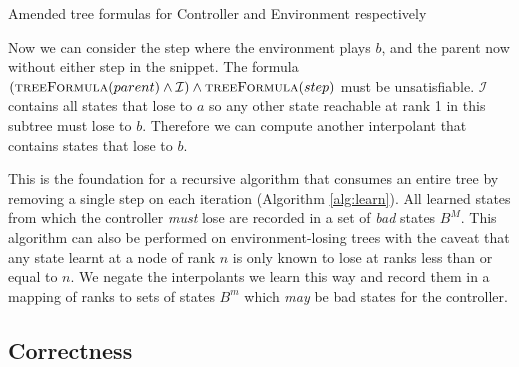 \documentclass{llncs}
\newcommand{\textoverline}[1]{$\overline{\mbox{#1}}$}
\begin{document}
\begin{algorithm}
    \caption{Amended tree formulas for Controller and Environment respectively}
    \label{alg:unboundedTreeFormula}
    \begin{algorithmic}[1]
        \State {}
        \Else
        \State {}
        \EndIf
        \EndFunction
    \end{algorithmic}

    \begin{algorithmic}
        \Function{\textoverline{treeFormula}}{gt}
        \State {}
        \Else
        \State {}
        \EndIf
        \EndFunction
    \end{algorithmic}
\end{algorithm}

Now we can consider the step where the environment plays $b$, and the parent
now without either step in the snippet. The formula
$(\textsc{treeFormula}(parent) \land \mathcal{I}) \land
\textsc{treeFormula}(step)$ must be unsatisfiable.  $\mathcal{I}$ contains all
states that lose to $a$ so any other state reachable at rank 1 in this subtree
must lose to $b$.  Therefore we can compute another interpolant that contains
states that lose to $b$.

This is the foundation for a recursive algorithm that consumes an entire tree
by removing a single step on each iteration (Algorithm \ref{alg:learn}). All
learned states from which the controller \emph{must} lose are recorded in a set
of \emph{bad} states $B^M$.  This algorithm can also be performed on
environment-losing trees with the caveat that any state learnt at a node of
rank $n$ is only known to lose at ranks less than or equal to $n$. We negate
the interpolants we learn this way and record them in a mapping of ranks to
sets of states $B^m$ which \emph{may} be bad states for the controller.

\subsection{Correctness}
\end{document}
